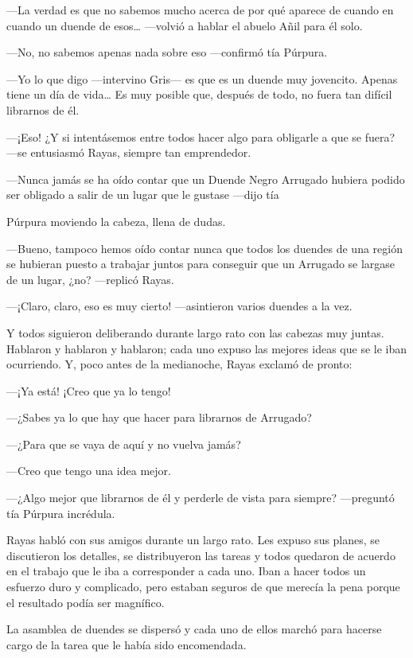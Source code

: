 \documentclass{barcodevapor3pags}
\begin{document}
---La verdad es que no sabemos mucho acerca de por qué aparece de cuando
en cuando un duende de esos\ldots{} ---volvió a hablar el abuelo Añil
para él solo.

---No, no sabemos apenas nada sobre eso ---confirmó tía Púrpura.

---Yo lo que digo ---intervino Gris--- es que es un duende muy
jovencito. Apenas tiene un día de vida\ldots{} Es muy posible que,
después de todo, no fuera tan difícil librarnos de él.

---¡Eso! ¿Y si intentásemos entre todos hacer algo para obligarle a que
se fuera? ---se entusiasmó Rayas, siempre tan emprendedor.

---Nunca jamás se ha oído contar que un Duende Negro Arrugado hubiera
podido ser obligado a salir de un lugar que le gustase ---dijo tía

Púrpura moviendo la cabeza, llena de dudas.

---Bueno, tampoco hemos oído contar nunca que todos los duendes de una
región se hubieran puesto a trabajar juntos para conseguir que un
Arrugado se largase de un lugar, ¿no? ---replicó Rayas.

---¡Claro, claro, eso es muy cierto! ---asintieron varios duendes a la
vez.

Y todos siguieron deliberando durante largo rato con las cabezas muy
juntas. Hablaron y hablaron y hablaron; cada uno expuso las mejores
ideas que se le iban ocurriendo. Y, poco antes de la medianoche, Rayas
exclamó de pronto:

---¡Ya está! ¡Creo que ya lo tengo!

---¿Sabes ya lo que hay que hacer para librarnos de Arrugado?

---¿Para que se vaya de aquí y no vuelva jamás?

---Creo que tengo una idea mejor.

---¿Algo mejor que librarnos de él y perderle de vista para siempre?
---preguntó tía Púrpura incrédula.

Rayas habló con sus amigos durante un largo rato. Les expuso sus planes,
se discutieron los detalles, se distribuyeron las tareas y todos
quedaron de acuerdo en el trabajo que le iba a corresponder a cada uno.
Iban a hacer todos un esfuerzo duro y complicado, pero estaban seguros
de que merecía la pena porque el resultado podía ser magnífico.

La asamblea de duendes se dispersó y cada uno de ellos marchó para
hacerse cargo de la tarea que le había sido encomendada.
\end{document}
